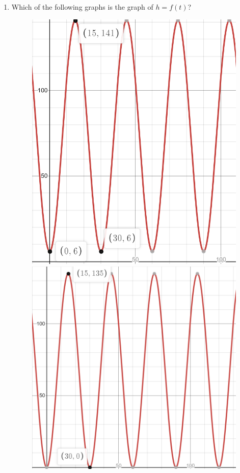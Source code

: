 \documentclass{ximera}
\begin{document}
\begin{exercise}
\begin{enumerate}
\item Which of the following graphs is the graph of $h = f(t)$?
\begin{figure}[!h]
\begin{image}
\includegraphics{ex2-a.png}
\hspace{20mm}
\includegraphics{ex2-b.png}


\end{image}
\end{figure}
\end{enumerate}
\end{exercise}
\end{document}
